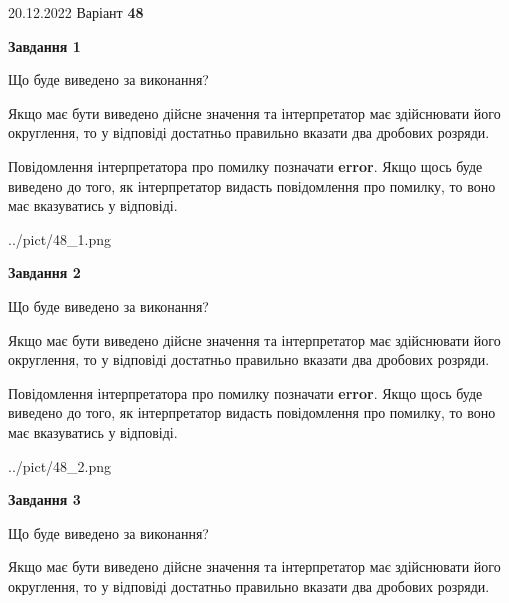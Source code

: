 \documentclass[12pt, ukrainian]{article}
\begin{document}
{20.12.2022 Варіант \No \textbf { 48 }\par}
{
\begin {Large}

{\begin {center}\textbf{Завдання 1}\end {center}}\par
Що буде виведено за виконання? \par

Якщо має бути виведено дійсне значення та інтерпретатор має здійснювати його округлення, 
то у відповіді достатньо правильно вказати два дробових розряди.

Повідомлення інтерпретатора про помилку позначати \textbf{error}.
Якщо щось буде виведено до того, як інтерпретатор видасть повідомлення про помилку, 
то воно має вказуватись у відповіді. \par

\begin{center}
	{../pict/48_1.png}
\end{center}
\newpage

{\begin {center}\textbf{Завдання 2}\end {center}}\par
Що буде виведено за виконання? \par

Якщо має бути виведено дійсне значення та інтерпретатор має здійснювати його округлення, 
то у відповіді достатньо правильно вказати два дробових розряди.

Повідомлення інтерпретатора про помилку позначати \textbf{error}.
Якщо щось буде виведено до того, як інтерпретатор видасть повідомлення про помилку, 
то воно має вказуватись у відповіді. \par

\begin{center}
	{../pict/48_2.png}
\end{center}
\newpage

{\begin {center}\textbf{Завдання 3}\end {center}}\par
Що буде виведено за виконання? \par

Якщо має бути виведено дійсне значення та інтерпретатор має здійснювати його округлення, 
то у відповіді достатньо правильно вказати два дробових розряди.


\end{Large}}
\end{document}
